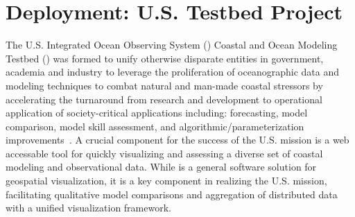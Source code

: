 \section{\sciwms{} Deployment: U.S. \ioos{} \comt{} Testbed Project}
\label{sec:ioos}
The U.S. Integrated Ocean Observing System (\ioos{}) Coastal and Ocean
Modeling Testbed (\comt{}) was formed to unify otherwise disparate
entities in government, academia and industry to leverage the
proliferation of oceanographic data and modeling techniques to combat
natural and man-made coastal stressors by accelerating the turnaround
from research and development to operational application of
society-critical applications including: forecasting, model
comparison, model skill assessment, and algorithmic/parameterization
improvements~\cite{luettich13}. A crucial component for the success of
the U.S. \ioos{} \comt{} mission is a web accessable tool for quickly
visualizing and assessing a diverse set of coastal modeling and
observational data. While \sciwms{} is a general software solution for
geospatial visualization, it is a key component in realizing the
U.S. \ioos{} \comt{} mission, facilitating qualitative model
comparisons and aggregation of distributed data with a unified
visualization framework.
\newif\iffoo
\footrue%
\iffoo
